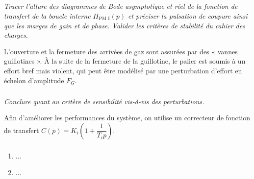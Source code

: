 \subparagraph{}
 \textit{Tracer l'allure des diagrammes de Bode asymptotique et réel de la fonction
de transfert de la boucle interne $H_{\text{PM I}}(p)$ et préciser la pulsation de coupure
ainsi que les marges de gain et de phase. Valider les critères de stabilité du
cahier des charges.}
\ifprof
\begin{corrige}
\end{corrige}
\else
\fi

L'ouverture et la fermeture des arrivées de gaz sont assurées par des « vannes
guillotines ». À la suite de la fermeture de la guillotine, le palier est soumis à un
effort bref mais violent, qui peut être modélisé par une perturbation d'effort en
échelon d'amplitude $F_G$.

\subparagraph{}
 \textit{Conclure quant au critère de sensibilité vis-à-vis des perturbations.}
 
 Afin d'améliorer les performances du système, on utilise un correcteur de fonction
de transfert $C(p)=K_i\left(1+\dfrac{1}{T_i p}\right)$.
 
\ifprof
\begin{corrige}
\end{corrige}
\else
\fi



\subparagraph{}
 \textit{}
\ifprof
\begin{corrige}
\end{corrige}
\else
\fi



\subparagraph{}
 \textit{}
\ifprof
\begin{corrige}
\end{corrige}
\else
\fi


\begin{enumerate}
\item ...
\item ...
\end{enumerate}